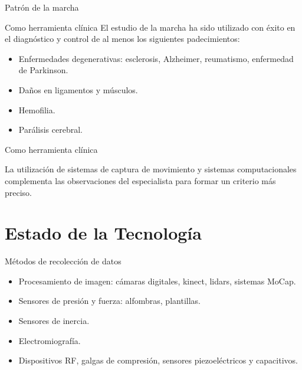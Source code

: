 \documentclass{beamer} %
\begin{document}
\begin{frame}{Patrón de la marcha}
        
\end{frame}

\begin{frame}{Como herramienta clínica}
    El estudio de la marcha ha sido utilizado con éxito en el diagnóstico y control de al menos los siguientes padecimientos:
    \begin{itemize}
        \item Enfermedades degenerativas: esclerosis, Alzheimer, reumatismo, enfermedad de Parkinson. 
        \item Daños en ligamentos y músculos.
        \item Hemofilia. 
        \item Parálisis cerebral. 
    \end{itemize}
\end{frame}


\begin{frame}{Como herramienta clínica}
    \begin{block}{}
        La utilización de sistemas de captura de movimiento y sistemas computacionales complementa las observaciones del especialista para formar un criterio más preciso. 
    \end{block}
\end{frame}

\section{Estado de la Tecnología}

\begin{frame}{Métodos de recolección de datos}
    \begin{itemize}
        \item Procesamiento de imagen: cámaras digitales, kinect, lidars, sistemas MoCap.
        \item Sensores de presión y fuerza: alfombras, plantillas.
        \item Sensores de inercia.
        \item Electromiografía.
        \item Dispositivos RF, galgas de compresión, sensores piezoeléctricos y capacitivos. 
    \end{itemize}
\end{frame}
\end{document}
